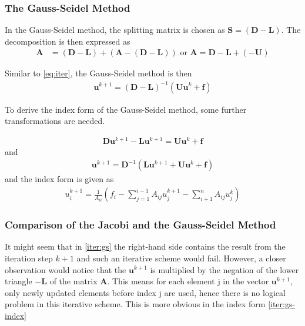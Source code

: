 \subsubsection{The Gauss-Seidel Method}
In the Gauss-Seidel method, the splitting matrix is chosen as $\boldsymbol{S} = (\boldsymbol{D} - \boldsymbol{L})$. The decomposition is then expressed as
\begin{align}
    \boldsymbol{A} &= (\boldsymbol{D} - \boldsymbol{L}) + (\boldsymbol{A} - (\boldsymbol{D} - \boldsymbol{L}))  \text{ or } \boldsymbol{A} = \boldsymbol{D} -\boldsymbol{L} + (- \boldsymbol{U})
\end{align}

Similar to \autoref{eq:iter}, the Gauss-Seidel method is then
\begin{align}
    \boldsymbol{u}^{k+1} = (\boldsymbol{D} - \boldsymbol{L})^{-1}( \boldsymbol{U}\boldsymbol{u}^k + \boldsymbol{f})
\end{align}

To derive the index form of the Gauss-Seidel method, some further transformations are needed.

\begin{align}
    \boldsymbol{D}\boldsymbol{u}^{k+1} - \boldsymbol{L}\boldsymbol{u}^{k+1} = \boldsymbol{U}\boldsymbol{u}^k + \boldsymbol{f}
\end{align}
and
\begin{align}
    \boldsymbol{u}^{k+1} = \boldsymbol{D}^{-1} (\boldsymbol{L}\boldsymbol{u}^{k+1} + \boldsymbol{U}\boldsymbol{u}^{k} + \boldsymbol{f}) 
    \label{iter:gs}
\end{align}
and the index form is given as
\begin{align}
    u_i^{k+1} = \frac{1}{A_{ii}} (f_i - \sum_{j=1}^{i-1}A_{ij}u_j^{k+1} -  \sum_{i+1}^{n}A_{ij}u_j^{k})
    \label{iter:gs-index}
\end{align}

\subsubsection{Comparison of the Jacobi and the Gauss-Seidel Method}
It might seem that in \autoref{iter:gs} the right-hand side contains the result from the iteration step $k+1$ and such an iterative scheme would fail. However, a closer observation would notice that the $\boldsymbol{u}^{k+1}$ is multiplied by the negation of the lower triangle $-\boldsymbol{L}$ of the matrix $\boldsymbol{A}$. This means for each element j in the vector $\boldsymbol{u}^{k+1}$, only newly updated elements before index j are used, hence there is no logical problem in this iterative scheme. This is more obvious in the index form \autoref{iter:gs-index}

